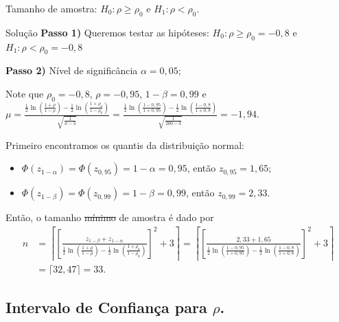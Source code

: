 \documentclass[9pt]{beamer}
\begin{document}
\begin{frame}{Tamanho de amostra: $H_0:\rho \geq \rho_0$ e $H_1: \rho < \rho_0$.}

\begin{block}{Solução}
	\textbf{Passo 1)} Queremos testar as hipóteses: $H_0: \rho \geq \rho_0 = -0,8$ e $H_1:  \rho < \rho_0 = -0,8$
	
	\textbf{Passo 2)} Nível de significância $\alpha = 0,05$;
	
	Note que $\rho_0=-0,8$, $\rho=-0,95$, $1-\beta = 0,99$ e $\mu = \frac{\frac{1}{2} \ln \left( \frac{1 + \rho}{1 - \rho} \right) - \frac{1}{2} \ln \left( \frac{1 + \rho_0}{1 - \rho_0} \right)}{\sqrt{\frac{1}{n-3}}}= \allowbreak \frac{\frac{1}{2} \ln \left( \frac{1 - 0,95}{1 + 0,95} \right) - \frac{1}{2} \ln \left( \frac{1 -0,8}{1 + 0,8} \right)}{\sqrt{\frac{1}{200-3}}} = -1,94$.
	
	Primeiro encontramos os quantis da distribuição normal:
	\begin{itemize}
		\item $\Phi\left(z_{1-\alpha}\right) = \Phi\left(z_{0,95}\right) =1- \alpha = 0,95$, então $z_{0,95} = 1,65$;
		\item $\Phi\left(z_{1 - \beta}\right) = \Phi\left(z_{0,99}\right) =1- \beta = 0,99$, então $z_{0,99} = 2,33$.
	\end{itemize}
	
	Então, o tamanho \sout{mínimo} de amostra é dado por
	\begin{align*}
		n &= \left\lceil \left[ \frac{z_{1-\beta} + z_{1-\alpha}}{ \frac{1}{2} \ln \left( \frac{1 + \rho}{1 - \rho} \right) - \frac{1}{2} \ln \left( \frac{1 + \rho_0}{1 - \rho_0} \right) } \right]^2 + 3  \right\rceil = \left\lceil \left[ \frac{2,33 + 1,65}{ \frac{1}{2} \ln \left( \frac{1 - 0,95}{1 + 0,95} \right) - \frac{1}{2} \ln \left( \frac{1 - 0,8}{1 + 0,8} \right) } \right]^2 + 3  \right\rceil\\
		&= \lceil 32,47 \rceil = 33.
	\end{align*}
\end{block}

\end{frame}

\subsection{Intervalo de Confiança para $\rho$.}
\end{document}
